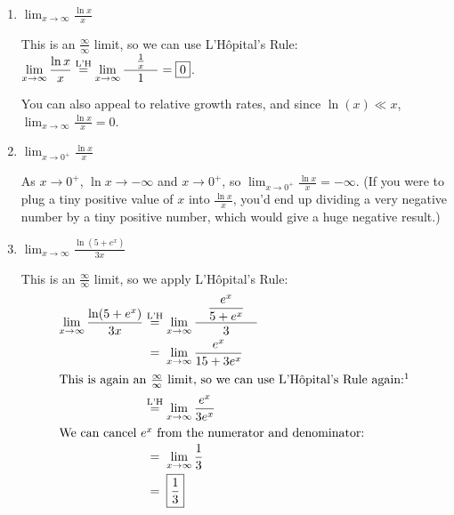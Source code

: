 \documentclass{article}
\begin{document}
\begin{enumerate}
  \probonly{}
    \begin{enumerate}
    \item
      \begin{problem}[\vfill]
        $\displaystyle \lim_{x \to \infty} \frac{\ln x}{x}$
      \end{problem}

      \begin{solution}
        This is an $\frac{\infty}{\infty}$ limit, so we can use
        L'H\^opital's Rule: $\displaystyle \lim_{x\to\infty} \frac{\ln
          x}{x} \stackrel{\text{L'H}}{=} \lim_{x\to\infty} \frac{\quad \frac{1}{x} \quad}{1}
        = \boxed{0}$.

              You can also appeal to relative growth rates, and since $\ln(x) \ll x$, $\displaystyle \lim_{x\to\infty} \frac{\ln
          x}{x} = \boxed{0}$.
      \end{solution}

    \item
      \begin{problem}[\vfill]
        $\displaystyle \lim_{x \to 0^+ } \frac{\ln x}{x}$
      \end{problem}

      \begin{solution}
        As $x \to 0^+$, $\ln x \to -\infty$ and $x \to 0^+$, so
        $\displaystyle \lim_{x \to 0^+ } \frac{\ln x}{x} =
        \boxed{-\infty}$.  (If you were to plug a tiny positive value of
        $x$ into $\frac{\ln x}{x}$, you'd end up dividing a very negative
        number by a tiny positive number, which would give a huge negative
        result.)
      \end{solution}

    \item
      \begin{problem}[\vfill]
        $\displaystyle \lim_{x \to \infty} \frac{\ln (5 + e^x)}{3x}$
      \end{problem}

      \begin{solution}
        This is an $\frac{\infty}{\infty}$ limit, so we apply
        L'H\^opital's Rule:
        \begin{align*}
          \lim_{x\to\infty} \frac{\ln(5+e^x)}{3x}  & \lheq
          \lim_{x\to\infty} \frac{\quad \dfrac{e^x}{5+e^x} \quad}{3} \\
          & \nolheq \lim_{x \to \infty} \frac{e^x}{15 + 3e^x} \\
          \intertext{This is again an $\frac{\infty}{\infty}$ limit, so we
            can use L'H\^opital's Rule again:\footnotemark}
          & \lheq \lim_{x \to \infty} \frac{e^x}{3e^x} \\
          \intertext{We can cancel $e^x$ from the numerator and
            denominator:} %
          & \nolheq \lim_{x \to \infty} \frac{1}{3} \\
          & \nolheq \boxed{\frac{1}{3}}
        \end{align*}
      \end{solution}


\end{enumerate}
\end{enumerate}
\end{document}
